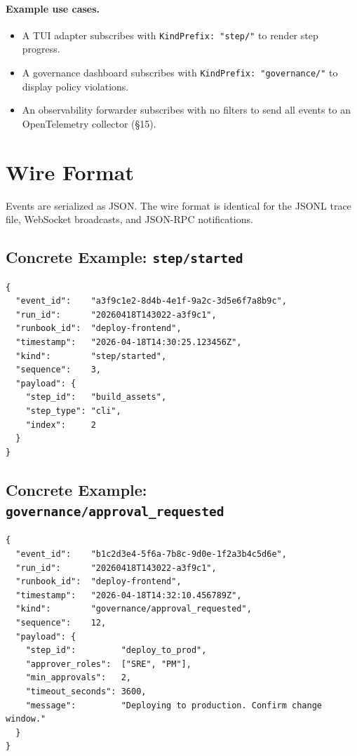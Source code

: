 \paragraph{Example use cases.}
\begin{itemize}
  \item A TUI adapter subscribes with \texttt{KindPrefix: "step/"} to render step progress.
  \item A governance dashboard subscribes with \texttt{KindPrefix: "governance/"} to display policy violations.
  \item An observability forwarder subscribes with no filters to send all events to an OpenTelemetry collector (§15).
\end{itemize}

\section{Wire Format}

Events are serialized as JSON. The wire format is identical for the JSONL trace file, WebSocket broadcasts, and JSON-RPC notifications.

\subsection{Concrete Example: \texttt{step/started}}

\begin{verbatim}
{
  "event_id":    "a3f9c1e2-8d4b-4e1f-9a2c-3d5e6f7a8b9c",
  "run_id":      "20260418T143022-a3f9c1",
  "runbook_id":  "deploy-frontend",
  "timestamp":   "2026-04-18T14:30:25.123456Z",
  "kind":        "step/started",
  "sequence":    3,
  "payload": {
    "step_id":   "build_assets",
    "step_type": "cli",
    "index":     2
  }
}
\end{verbatim}

\subsection{Concrete Example: \texttt{governance/approval\_requested}}

\begin{verbatim}
{
  "event_id":    "b1c2d3e4-5f6a-7b8c-9d0e-1f2a3b4c5d6e",
  "run_id":      "20260418T143022-a3f9c1",
  "runbook_id":  "deploy-frontend",
  "timestamp":   "2026-04-18T14:32:10.456789Z",
  "kind":        "governance/approval_requested",
  "sequence":    12,
  "payload": {
    "step_id":         "deploy_to_prod",
    "approver_roles":  ["SRE", "PM"],
    "min_approvals":   2,
    "timeout_seconds": 3600,
    "message":         "Deploying to production. Confirm change window."
  }
}
\end{verbatim}

